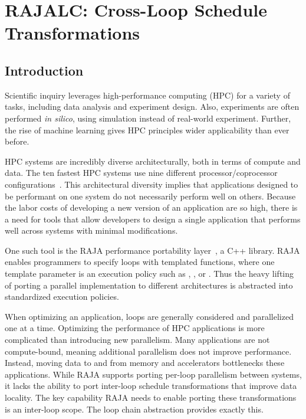 \chapter{RAJALC: Cross-Loop Schedule Transformations}
\label{chap:RAJALC}
\section{Introduction}
Scientific inquiry leverages high-performance computing (HPC) for a variety of
tasks, including data analysis and experiment design. 
Also, experiments are often performed \textit{in silico}, using 
simulation instead of real-world experiment.
Further, the rise of machine learning gives HPC principles wider
applicability than ever before.

HPC systems are incredibly diverse architecturally, 
both in terms of compute and data.
The ten fastest HPC systems use nine different processor/coprocessor
configurations~\cite{top500}.
This architectural diversity implies that applications designed to be
performant on one system do not necessarily perform well on others.
Because the labor costs of developing a new version of an application are so high, 
there is a need for tools that allow developers to design a single application
that performs well across systems with minimal modifications.

One such tool is the RAJA performance portability layer~\cite{RAJA}, a C++ library.
RAJA enables programmers to specify loops with templated functions,
where one template parameter is an execution policy such as 
, , or .
Thus the heavy lifting of porting a parallel implementation to different 
architectures is abstracted into standardized execution policies.


When optimizing an application, loops are generally considered and
parallelized one at a time.
Optimizing the performance of HPC applications is more complicated than introducing new parallelism.
Many applications are not compute-bound, meaning additional parallelism does not improve performance. 
Instead, moving data to and from memory and accelerators bottlenecks these applications. 
While RAJA supports porting per-loop parallelism between systems, it lacks the ability to port inter-loop schedule transformations that improve data locality. 
The key capability RAJA needs to enable porting these transformations is an inter-loop scope.
The loop chain abstraction provides exactly this.

